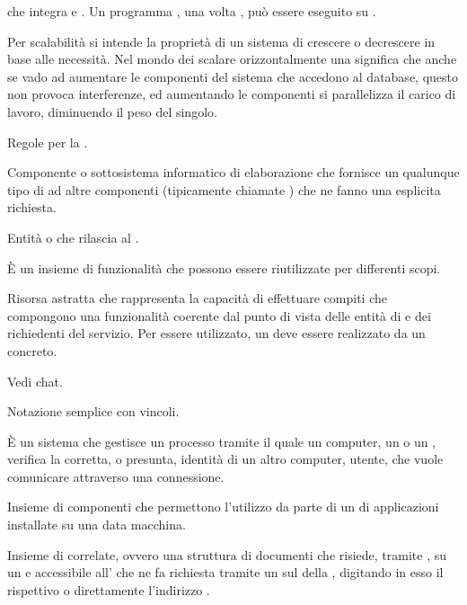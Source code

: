 { che integra  e . Un programma , una volta , può essere eseguito su .}

{Per scalabilità si intende la proprietà di un sistema di crescere o decrescere in base alle necessità. Nel mondo dei  scalare orizzontalmente una  significa che anche se vado ad aumentare le componenti del sistema che accedono al database, questo non provoca interferenze, ed aumentando le componenti si parallelizza il carico di lavoro, diminuendo il peso del singolo.
}

{Regole per la .}

{Componente o sottosistema informatico di elaborazione che fornisce un qualunque tipo di  ad altre componenti (tipicamente chiamate ) che ne fanno una esplicita richiesta.}

{Entità  o  che rilascia  al .}

{\`{E} un insieme di funzionalità  che possono essere riutilizzate per differenti scopi.}

{Risorsa astratta che rappresenta la capacità di effettuare compiti che compongono una funzionalità coerente dal punto di vista delle entità di   e dei richiedenti del servizio. Per essere utilizzato, un  deve essere realizzato da un  concreto.}

{Vedi chat.}


{Notazione semplice con vincoli.}

{\`{E} un sistema che gestisce un processo tramite il quale un computer, un  o un , verifica la corretta, o presunta, identità di un altro computer, utente, che vuole comunicare attraverso una connessione.}

{Insieme di componenti  che permettono l'utilizzo da parte di un  di applicazioni installate su una data macchina.}

{Insieme di  correlate, ovvero una struttura  di documenti che risiede, tramite , su un   e accessibile all'  che ne fa richiesta tramite un   sul  della  , digitando in esso il rispettivo  o direttamente l'indirizzo .}

